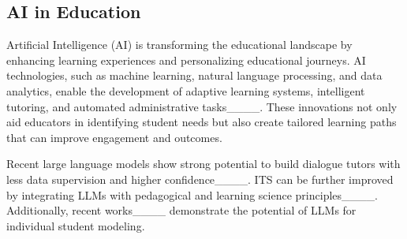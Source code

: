 

\subsection{AI in Education}
Artificial Intelligence (AI) is transforming the educational landscape by enhancing learning experiences and personalizing educational journeys. AI technologies, such as machine learning, natural language processing, and data analytics, enable the development of adaptive learning systems, intelligent tutoring, and automated administrative tasks____. These innovations not only aid educators in identifying student needs but also create tailored learning paths that can improve engagement and outcomes.

Recent large language models show strong potential to build dialogue tutors with less data supervision and higher confidence____. ITS can be further improved by integrating LLMs with pedagogical and learning science principles____. Additionally, recent works____ demonstrate the potential of LLMs for individual student modeling.